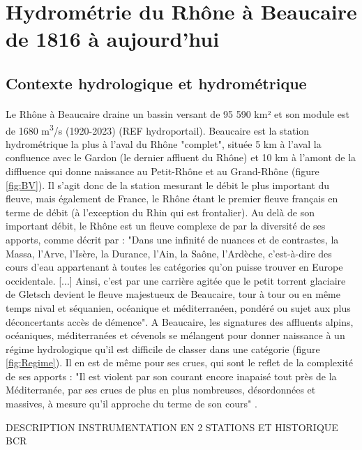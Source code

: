 \documentclass[11pt]{article}
\begin{document}
\section{Hydrométrie du Rhône à Beaucaire de 1816 à aujourd'hui}

	\subsection{Contexte hydrologique et hydrométrique}
	
	\paragraph{} Le Rhône à Beaucaire draine un bassin versant de 95 590 km² et son module est de 1680 m\textsuperscript{3}/s (1920-2023) (REF hydroportail). Beaucaire est la station hydrométrique la plus à l'aval du Rhône "complet", située 5 km à l'aval la confluence avec le Gardon (le dernier affluent du Rhône) et 10 km à l'amont de la diffluence qui donne naissance au Petit-Rhône et au Grand-Rhône (figure \ref{fig:BV}). Il s'agit donc de la station mesurant le débit le plus important du fleuve, mais également de France, le Rhône étant le premier fleuve français en terme de débit (à l'exception du Rhin qui est frontalier). Au delà de son important débit, le Rhône est un fleuve complexe de par la diversité de ses apports, comme décrit par \citet{parde_regime_1925} : "Dans une infinité de nuances et de contrastes, la Massa, l'Arve, l'Isère, la Durance, l'Ain, la Saône, l'Ardèche, c'est-à-dire des cours d'eau appartenant à toutes les catégories qu'on puisse trouver en Europe occidentale. [...] Ainsi, c'est par une carrière agitée que le petit torrent glaciaire de Gletsch devient le fleuve majestueux de Beaucaire, tour à tour ou en même temps nival et séquanien, océanique et méditerranéen, pondéré ou sujet aux plus déconcertants accès de démence". A Beaucaire, les signatures des affluents alpins, océaniques, méditerranées et cévenols se mélangent pour donner naissance à un régime hydrologique qu'il est difficile de classer dans une catégorie (figure \ref{fig:Regime}). Il en est de même pour ses crues, qui sont le reflet de la complexité de ses apports : "Il est violent par son courant encore inapaisé tout près de la Méditerranée, par ses crues de plus en plus nombreuses, désordonnées et massives, à mesure qu'il approche du terme de son cours" \citep{parde_regime_1925}. 


DESCRIPTION INSTRUMENTATION EN 2 STATIONS ET HISTORIQUE BCR
\end{document}
